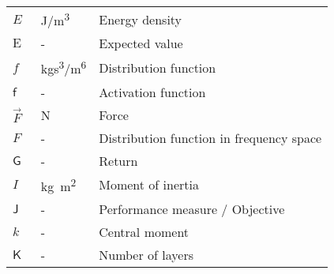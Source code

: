 \begin{longtable}{p{5cm}p{4cm}p{5cm}}
    $E$                     & \SI{}{J/m^3}  & Energy density \\
    $\mathrm{E}$			& \SI{}{-}		& Expected value \\
    $f$						& \SI{}{kgs^3/m^6} & Distribution function \\
    $\mathsf{f}$			& \SI{}{-}		& Activation function \\
    $\vec{F}$				& \SI{}{N}		& Force \\
    $F$						& \SI{}{-}		& Distribution function in frequency space \\
    $\mathsf{G}$			& \SI{}{-}		& Return \\
    $I$						& \SI{}{kg m^2} & Moment of inertia \\
    $\mathsf{J}$			& \SI{}{-}		& Performance measure / Objective \\
    $k$						& \SI{}{-}		& Central moment \\
    $\mathsf{K}$			& \SI{}{-}		& Number of layers \\

\end{longtable}
